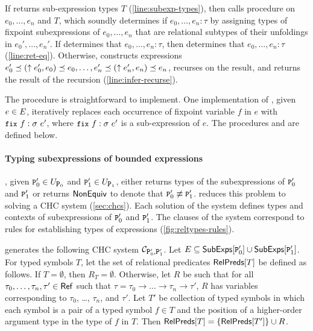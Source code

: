 If \inferbnd returns sub-expression types $T$
(\autoref{line:subexp-types}), then \inferaux calls procedure
\chkinductive on $e_0, \ldots, e_n$ and $T$, which soundly determines
if $e_0, \ldots, e_n : \tau$ by assigning types of fixpoint
subexpressions of $e_0, \ldots, e_n$ that are relational subtypes of
their unfoldings in $e_0', \ldots, e_n'$.
%
If \chkinductive determines that $e_0, \ldots, e_n : \tau$, then \sys
determines that $e_0, \ldots, e_n : \tau$ (\autoref{line:ret-eq}).
%
Otherwise, \chkinductive constructs expressions
$e_0' \preceq (\uparrow e_0', e_0) \preceq e_0, \ldots, e_n'
\preceq (\uparrow e_n', e_n) \preceq e_n$, recurses on the result,
and returns the result of the recursion
(\autoref{line:infer-recurse}).

The procedure \unfoldexp is straightforward to implement.
%
One implementation of \unfoldexp, given $e \in E$, iteratively
replaces each occurrence of fixpoint variable $f$ in $e$ with
$\fix{f}{\sigma}{e'}$, where $\fix{f}{\sigma}{e'}$ is a sub-expression
of $e$.
%
The procedures \inferbnd and \chkinductive are defined below.

\paragraph{Typing subexpressions of bounded expressions}
\label{sec:type-bnd}
\verifybnd, given $\cc{P}_0' \in \unfoldings{ \cc{P}_0 }$ and
$\cc{P}_1' \in \unfoldings{ \cc{P}_1 }$, either returns types of the
subexpressions of $\cc{P}_0'$ and $\cc{P}_1'$ or returns $\mathsf{NonEquiv}$
to denote that $\cc{P}_0' \not\equiv \cc{P}_1'$.
%
\verifybnd reduces this problem to solving a CHC system
(\autoref{sec:chcs}).
%
Each solution of the system defines types and contexts of
subexpressions of $\cc{P}_0'$ and $\cc{P}_1'$.
%
The clauses of the system correspond to rules for establishing types
of expressions (\autoref{fig:reltypes-rules}).

%
\verifybnd generates the following CHC system $\mathcal{C}_{
  \cc{P}_0', \cc{P}_1' }$.
Let $E \subseteq \subexps{ \cc{P}_0' } \union \subexps{ \cc{P}_1' }$.
For typed symbols $T$, let the set of relational predicates
$\mathsf{RelPreds}[  T  ]$ be defined as follows.
If $T = \emptyset$, then $R_T = \emptyset$.
Otherwise, let $R$ be such that for all $\tau_0, \ldots, \tau_n, \tau'
\in \mathsf{Ref}$ such that $\tau = \tau_0 \rightarrow \ldots \rightarrow
\tau_n \rightarrow \tau'$, $R$ has variables corresponding to
$\tau_0$, \ldots, $\tau_n$, and $\tau'$.
%
Let $T'$ be collection of typed symbols in which each symbol is a pair
of a typed symbol $f \in T$ and the position of a higher-order
argument type in the type of $f$ in $T$.
%
Then $\mathsf{RelPreds}[  T  ] = \{  \mathsf{RelPreds}[  T'  ]  \} \cup  R $.


